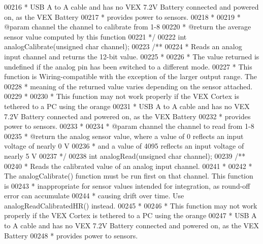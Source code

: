 \begin{DoxyCode}
00216 \textcolor{comment}{ * USB A to A cable and has no VEX 7.2V Battery connected and powered on, as the VEX Battery}
00217 \textcolor{comment}{ * provides power to sensors.}
00218 \textcolor{comment}{ *}
00219 \textcolor{comment}{ * @param channel the channel to calibrate from 1-8}
00220 \textcolor{comment}{ * @return the average sensor value computed by this function}
00221 \textcolor{comment}{ */}
00222 \textcolor{keywordtype}{int} analogCalibrate(\textcolor{keywordtype}{unsigned} \textcolor{keywordtype}{char} channel);
00223 \textcolor{comment}{/**}
00224 \textcolor{comment}{ * Reads an analog input channel and returns the 12-bit value.}
00225 \textcolor{comment}{ *}
00226 \textcolor{comment}{ * The value returned is undefined if the analog pin has been switched to a different mode.}
00227 \textcolor{comment}{ * This function is Wiring-compatible with the exception of the larger output range. The}
00228 \textcolor{comment}{ * meaning of the returned value varies depending on the sensor attached.}
00229 \textcolor{comment}{ *}
00230 \textcolor{comment}{ * This function may not work properly if the VEX Cortex is tethered to a PC using the orange}
00231 \textcolor{comment}{ * USB A to A cable and has no VEX 7.2V Battery connected and powered on, as the VEX Battery}
00232 \textcolor{comment}{ * provides power to sensors.}
00233 \textcolor{comment}{ *}
00234 \textcolor{comment}{ * @param channel the channel to read from 1-8}
00235 \textcolor{comment}{ * @return the analog sensor value, where a value of 0 reflects an input voltage of nearly 0 V}
00236 \textcolor{comment}{ * and a value of 4095 reflects an input voltage of nearly 5 V}
00237 \textcolor{comment}{ */}
00238 \textcolor{keywordtype}{int} analogRead(\textcolor{keywordtype}{unsigned} \textcolor{keywordtype}{char} channel);
00239 \textcolor{comment}{/**}
00240 \textcolor{comment}{ * Reads the calibrated value of an analog input channel.}
00241 \textcolor{comment}{ *}
00242 \textcolor{comment}{ * The analogCalibrate() function must be run first on that channel. This function is}
00243 \textcolor{comment}{ * inappropriate for sensor values intended for integration, as round-off error can accumulate}
00244 \textcolor{comment}{ * causing drift over time. Use analogReadCalibratedHR() instead.}
00245 \textcolor{comment}{ *}
00246 \textcolor{comment}{ * This function may not work properly if the VEX Cortex is tethered to a PC using the orange}
00247 \textcolor{comment}{ * USB A to A cable and has no VEX 7.2V Battery connected and powered on, as the VEX Battery}
00248 \textcolor{comment}{ * provides power to sensors.}

\end{DoxyCode}
